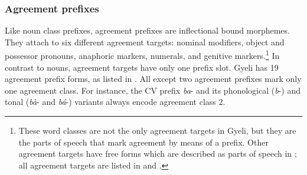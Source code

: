 \subsubsection{Agreement prefixes}
\label{sec:AGRPre}

Like noun class prefixes, agreement prefixes are inflectional bound morphemes. They attach to six different agreement targets: nominal modifiers, object and possessor pronouns, anaphoric markers, numerals, and genitive markers.\footnote{These word classes are not the only agreement targets in Gyeli, but they are the parts of speech that mark agreement by means of a prefix. Other agreement targets have free forms which are described as parts of speech in ; all agreement targets are listed in  and .}  In contrast to nouns, agreement targets have only one prefix slot. Gyeli has 19 agreement prefix forms, as listed in . All except two agreement prefixes mark only one agreement class. For instance, the CV prefix {\itshape ba}- and its phonological ({\itshape b}-) and tonal ({\itshape bà}- and {\itshape bá}-) variants always encode agreement class 2.


